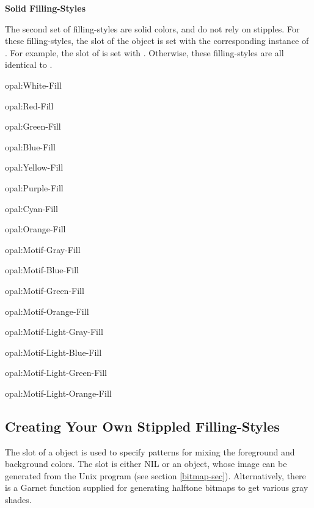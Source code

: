 \vspace{1 line}
\begin{group}
{\bf Solid Filling-Styles}

The second set of filling-styles are solid colors, and do not rely on stipples.
For these filling-styles, the  slot of the object is
set with the corresponding instance of .  For example, the
 slot of  is set with .
Otherwise, these filling-styles are all identical to
.

\vspace{1 line}
   
  
\begin{text}
opal:White-Fill

opal:Red-Fill

opal:Green-Fill

opal:Blue-Fill

opal:Yellow-Fill

opal:Purple-Fill

opal:Cyan-Fill

opal:Orange-Fill
\end{text}

\vspace{1 line}
 
 
\begin{text}
opal:Motif-Gray-Fill

opal:Motif-Blue-Fill

opal:Motif-Green-Fill

opal:Motif-Orange-Fill

opal:Motif-Light-Gray-Fill

opal:Motif-Light-Blue-Fill

opal:Motif-Light-Green-Fill

opal:Motif-Light-Orange-Fill
\end{text}
\end{group}


\subsection{Creating Your Own Stippled Filling-Styles}
\label{custom-stipple}

The  slot of a  object is used to specify
patterns for mixing the foreground and background colors.  The 
slot is either NIL or an  object, whose image can be generated
from the  Unix program (see section
\ref{bitmap-sec}).  Alternatively, there is a Garnet
function supplied for generating halftone bitmaps to get various gray
shades.

